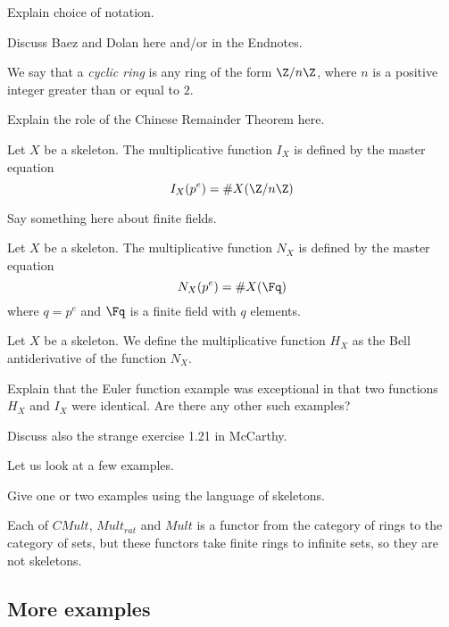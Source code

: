 \documentclass[a4paper]{article}
\begin{document}
Explain choice of notation.

Discuss Baez and Dolan \cite{} here and/or in the Endnotes.


\begin{definition}
We say that a \emph{cyclic ring} is any ring of the form $\Z / n \Z$, where $n$ is a positive integer greater than or equal to $2$. 
\end{definition}

Explain the role of the Chinese Remainder Theorem here.

\begin{definition}
Let $X$ be a skeleton. The multiplicative function $I_X$ is defined by the master equation
$$  I_X(p^e) = \# X( \Z / n \Z  )  $$

\end{definition}

Say something here about finite fields.

\begin{definition}
Let $X$ be a skeleton. The multiplicative function $N_X$ is defined by the master equation
$$  N_X(p^e) = \# X( \Fq )  $$
where $q= p^e$ and $\Fq$ is a finite field with $q$ elements. 
\end{definition}

\begin{definition}
Let $X$ be a skeleton. We define the multiplicative function $H_X$ as the Bell antiderivative of the function $N_X$.

\end{definition}

Explain that the Euler function example was exceptional in that two functions $H_X$ and $I_X$ were identical. Are there any other such examples? 

Discuss also the strange exercise 1.21 in McCarthy.

Let us look at a few examples.

\begin{example}
Give one or two examples using the language of skeletons.

\end{example}

\begin{remark}
Each of $CMult$, $Mult_{rat}$ and $Mult$ is a functor from the category of rings to the category of sets, but these functors take finite rings to infinite sets, so they are not skeletons.
\end{remark}


\subsection{More examples}
\end{document}
